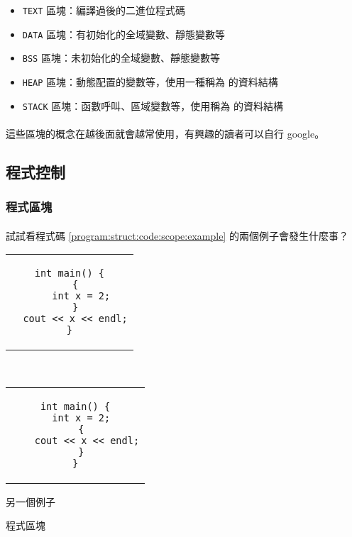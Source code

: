 \documentclass[12pt,a4paper,oneside]{article}
\begin{document}
\begin{CJK}{UTF8}{bkai}
\begin{itemize}
\item \lstinline!TEXT! 區塊：編譯過後的二進位程式碼
\item \lstinline!DATA! 區塊：有初始化的全域變數、靜態變數等
\item \lstinline!BSS! 區塊：未初始化的全域變數、靜態變數等
\item \lstinline!HEAP! 區塊：動態配置的變數等，使用一種稱為 的資料結構
\item \lstinline!STACK! 區塊：函數呼叫、區域變數等，使用稱為 的資料結構
\end{itemize}

\paragraph{}這些區塊的概念在越後面就會越常使用，有興趣的讀者可以自行 google。

\subsection{程式控制}

\subsubsection{程式區塊}

\paragraph{}試試看程式碼 \ref{program:struct:code:scope:example} 的兩個例子會發生什麼事？

\begin{code}[h!]
\centering
\begin{subcode}{.43\textwidth}
  \centering
  \begin{tabular}{c}
  \begin{lstlisting}
int main() {
  {
    int x = 2;
  }
  cout << x << endl;
}
  \end{lstlisting}
  \end{tabular}
  \caption{被大括號包住的 \lstinline!x!}
  \label{program:struct:code:scope:example:1}
\end{subcode}
~
\begin{subcode}{.43\textwidth}
  \centering
  \begin{tabular}{c}
  \begin{lstlisting}
int main() {
  int x = 2;
  {
    cout << x << endl;
  }
}
  \end{lstlisting}
  \end{tabular}
  \caption{另一個例子}
  \label{program:struct:code:scope:example:2}
\end{subcode}
\caption{程式區塊}
\label{program:struct:code:scope:example}
\end{code}


\end{CJK}
\end{document}
